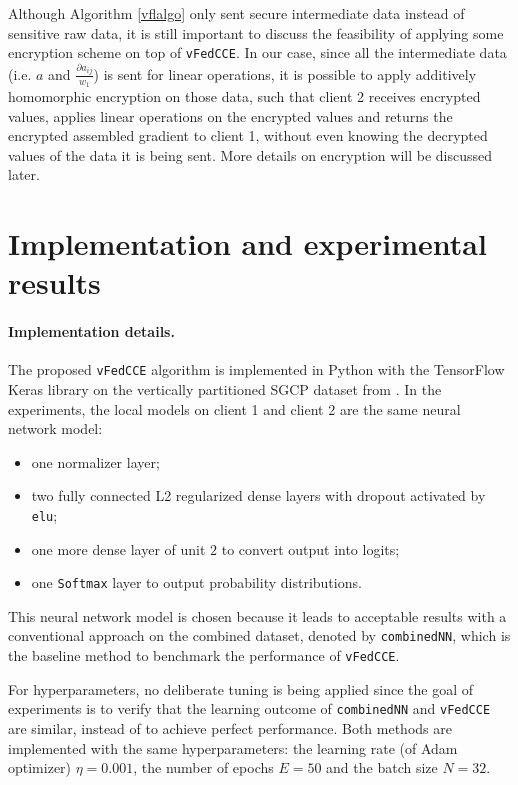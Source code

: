 \documentclass{article}
\begin{document}
Although Algorithm \ref{vflalgo} only sent secure intermediate data instead of sensitive raw data, it is still important to discuss the feasibility of applying some encryption scheme on top of \texttt{vFedCCE}. In our case, since all the intermediate data (i.e. $a$ and $\frac{\partial a_{ij}}{w_1}$) is sent for linear operations, it is possible to apply additively homomorphic encryption on those data, such that client 2 receives encrypted values, applies linear operations on the encrypted values and returns the encrypted assembled gradient to client 1, without even knowing the decrypted values of the data it is being sent. More details on encryption will be discussed later.

\section{Implementation and experimental results}\label{vflexp}
\paragraph{Implementation details.} The proposed \texttt{vFedCCE} algorithm is implemented in Python with the TensorFlow Keras library on the vertically partitioned SGCP dataset from \cite{groemping2019south}. In the experiments, the local models on client 1 and client 2 are the same neural network model:
\begin{itemize}
  \setlength\itemsep{0em}
  \item one normalizer layer;
  \item two fully connected L2 regularized dense layers with dropout activated by \texttt{elu};
  \item one more dense layer of unit $2$ to convert output into logits;
  \item one \texttt{Softmax} layer to output probability distributions.
\end{itemize}
This neural network model is chosen because it leads to acceptable results with a conventional approach on the combined dataset, denoted by \texttt{combinedNN}, which is the baseline method to benchmark the performance of \texttt{vFedCCE}.

For hyperparameters, no deliberate tuning is being applied since the goal of experiments is to verify that the learning outcome of \texttt{combinedNN} and \texttt{vFedCCE} are similar, instead of to achieve perfect performance. Both methods are implemented with the same hyperparameters: the learning rate (of Adam optimizer) $\eta=0.001$, the number of epochs $E=50$ and the batch size $N=32$.
\end{document}
